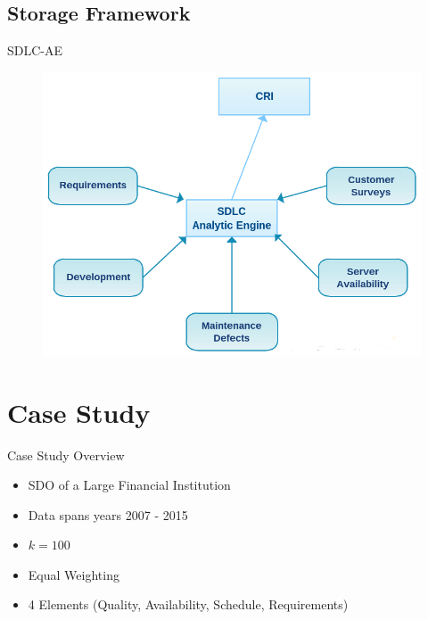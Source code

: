     \subsection{Storage Framework}
        \begin{frame}{SDLC-AE}
            \begin{figure}[ht]
                \centering
                \includegraphics[scale=.5]{images/sdlcae.png}
            \end{figure}
        \end{frame}

\section{Case Study}
        \begin{frame}{Case Study Overview}
            \begin{itemize}
                \item SDO of a Large Financial Institution
                \item Data spans years 2007 - 2015
                \item $k = 100$
                \item Equal Weighting
                \item 4 Elements (Quality, Availability, Schedule, Requirements)
            \end{itemize}
        \end{frame}
